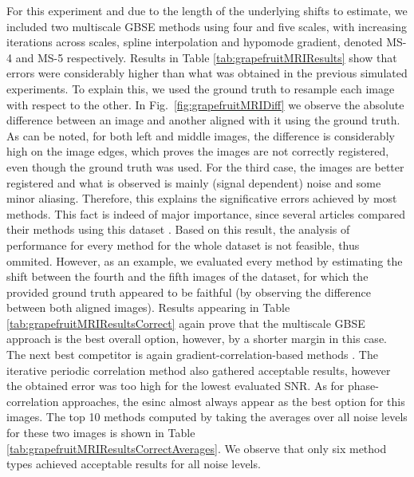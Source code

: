 For this experiment and due to the length of the underlying shifts to estimate, we included two multiscale GBSE methods using four and five scales, with increasing iterations across scales, spline interpolation and hypomode gradient, denoted MS-4 and MS-5 respectively. Results in Table \ref{tab:grapefruitMRIResults} show that errors were considerably higher than what was obtained in the previous simulated experiments. To explain this, we used the ground truth to resample each image with respect to the other. In Fig.~\ref{fig:grapefruitMRIDiff} we observe the absolute difference between an image and another aligned with it using the ground truth. As can be noted, for both left and middle images, the difference is considerably high on the image edges, which proves the images are not correctly registered, even though the ground truth was used. For the third case, the images are better registered and what is observed is mainly (signal dependent) noise  and some minor aliasing. Therefore, this explains the significative errors achieved by most methods. This fact is indeed of major importance, since several articles compared their methods using this dataset \cite{Hoge_2003, Ren_2010, Ren_2014, Tzimiropoulos2011}. Based on this result, the analysis of performance for every method for the whole dataset is not feasible, thus ommited. However, as an example, we evaluated every method by estimating the shift between the fourth and the fifth images of the dataset, for which the provided ground truth appeared to be faithful (by observing the difference between both aligned images). Results appearing in Table \ref{tab:grapefruitMRIResultsCorrect} again prove that the multiscale GBSE approach is the best overall option, however, by a shorter margin in this case. The next best competitor is again gradient-correlation-based methods \cite{Tzimiropoulos2011, Argyriou2004}. The iterative periodic correlation method \cite{Sidick2011} also gathered acceptable results, however the obtained error was too high for the lowest evaluated SNR. As for phase-correlation approaches, the esinc \cite{Argyriou2006} almost always appear as the best option for this images. The top 10 methods computed by taking the averages over all noise levels for these two images is shown in Table \ref{tab:grapefruitMRIResultsCorrectAverages}. We observe that only six method types achieved acceptable results for all noise levels.

